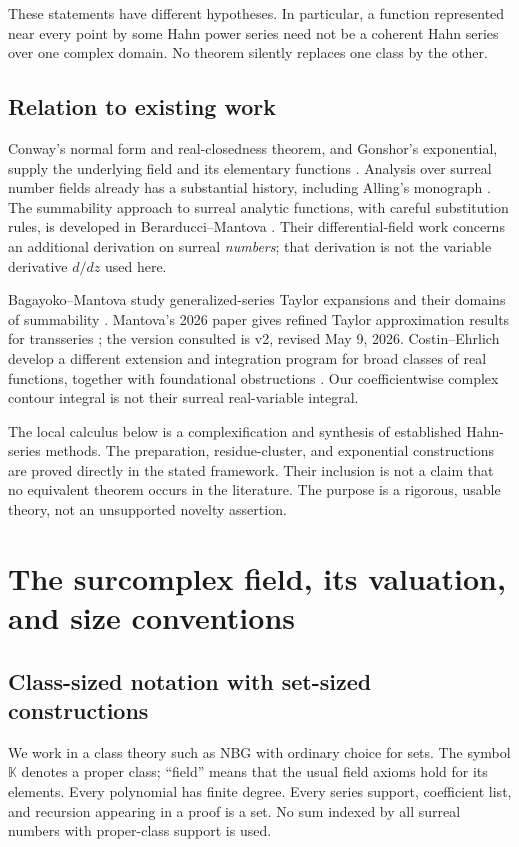 \documentclass[11pt,a4paper]{article}
\numberwithin{equation}{section}
\theoremstyle{definition}
\theoremstyle{remark}
\newcommand{\K}{\mathbb K}
\begin{document}
These statements have different hypotheses. In particular, a function represented near every point by some Hahn power series need not be a coherent Hahn series over one complex domain. No theorem silently replaces one class by the other.

\subsection{Relation to existing work}
Conway's normal form and real-closedness theorem, and Gonshor's exponential, supply the underlying field and its elementary functions \cite{Conway,Gonshor}. Analysis over surreal number fields already has a substantial history, including Alling's monograph \cite{Alling}. The summability approach to surreal analytic functions, with careful substitution rules, is developed in Berarducci--Mantova \cite{BMgerms}. Their differential-field work \cite{BMderiv} concerns an additional derivation on surreal \emph{numbers}; that derivation is not the variable derivative $d/dz$ used here.

Bagayoko--Mantova study generalized-series Taylor expansions and their domains of summability \cite{BagMant}. Mantova's 2026 paper gives refined Taylor approximation results for transseries \cite{Mantova2026}; the version consulted is v2, revised May 9, 2026. Costin--Ehrlich develop a different extension and integration program for broad classes of real functions, together with foundational obstructions \cite{CostinEhrlich}. Our coefficientwise complex contour integral is not their surreal real-variable integral.

The local calculus below is a complexification and synthesis of established Hahn-series methods. The preparation, residue-cluster, and exponential constructions are proved directly in the stated framework. Their inclusion is not a claim that no equivalent theorem occurs in the literature. The purpose is a rigorous, usable theory, not an unsupported novelty assertion.

\section{The surcomplex field, its valuation, and size conventions}
\label{sec:field}
\subsection{Class-sized notation with set-sized constructions}
We work in a class theory such as NBG with ordinary choice for sets. The symbol $\K$ denotes a proper class; ``field'' means that the usual field axioms hold for its elements. Every polynomial has finite degree. Every series support, coefficient list, and recursion appearing in a proof is a set. No sum indexed by all surreal numbers with proper-class support is used.
\end{document}
